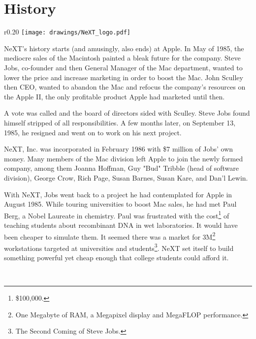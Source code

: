 \section{History}

\begin{wrapfigure}[8]{r}{0.20\textwidth}
\centering
\texttt{[image: drawings/NeXT\_logo.pdf]}
\end{wrapfigure}
\par
NeXT's history starts (and amusingly, also ends) at Apple. In May of 1985, the mediocre sales of the Macintosh painted a bleak future for the company. Steve Jobs, co-founder and then General Manager of the Mac department, wanted to lower the price and increase marketing in order to boost the Mac. John Sculley then CEO, wanted to abandon the Mac and refocus the company's resources on the Apple II, the only profitable product Apple had marketed until then.\\
\par
 A vote was called and the board of directors sided with Sculley. Steve Jobs found himself stripped of all responsibilities. A few months later, on September 13, 1985, he resigned and went on to work on his next project.\\
\par
NeXT, Inc. was incorporated in February 1986 with \$7 million of Jobs' own money. Many members of the Mac division left Apple to join the newly formed company, among them  Joanna Hoffman, Guy "Bud" Tribble (head of software division), George Crow, Rich Page, Susan Barnes, Susan Kare, and Dan'l Lewin.\\ 
\par
With NeXT, Jobs went back to a project he had contemplated for Apple in August 1985. While touring universities to boost Mac sales, he had met Paul Berg, a Nobel Laureate in chemistry. Paul was frustrated with the cost\footnote{\$100,000.} of teaching students about recombinant DNA in wet laboratories. It would have been cheaper to simulate them. It seemed there was a market for 3M\footnote{One Megabyte of RAM, a Megapixel display and MegaFLOP performance.} workstations targeted at universities and students\footnote{The Second Coming of Steve Jobs.}. NeXT set itself to build something powerful yet cheap enough that college students could afford it.\\
\par
{}\\

